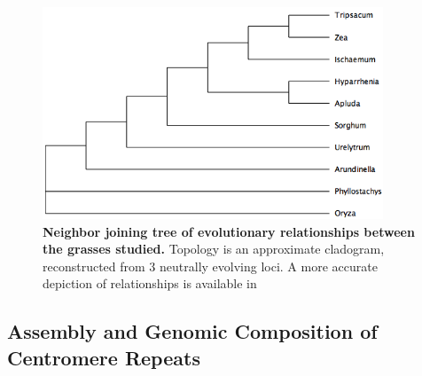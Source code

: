 \documentclass[10pt,letterpaper]{article}
\newcommand{\jri}[1]{\todo[size=\scriptsize, color=SkyBlue]{#1}}
\newcommand{\pb}[1]{\todo[size=\scriptsize, color=Bittersweet]{#1}} %
\begin{document}
\begin{figure}[h]
\begin{center}
\includegraphics[width=4in]{Phylotree_centrepeat.png}
\end{center}
\caption{{\bf Neighbor joining tree of evolutionary relationships between the grasses studied.}
Topology is an approximate cladogram, reconstructed from 3 neutrally evolving loci.
A more accurate depiction of relationships is available in \cite{wu2012phylogeny,skendzic2007phylogenetics}}
\label{phylotree}
\end{figure}
\subsection*{Assembly and Genomic Composition of Centromere Repeats}

\end{document}

